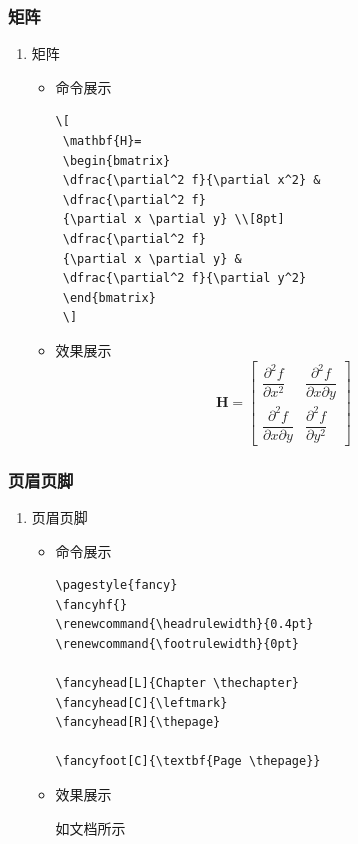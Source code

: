 \documentclass[UTF8]{ctexart}
\begin{document}
\subsubsection{矩阵}
\begin{enumerate}
  \item 矩阵
   \begin{itemize}
      \item 命令展示
\begin{lstlisting}
\[
 \mathbf{H}=
 \begin{bmatrix}
 \dfrac{\partial^2 f}{\partial x^2} &
 \dfrac{\partial^2 f}
 {\partial x \partial y} \\[8pt]
 \dfrac{\partial^2 f}
 {\partial x \partial y} &
 \dfrac{\partial^2 f}{\partial y^2}
 \end{bmatrix}
 \]
\end{lstlisting}
\item 效果展示
\[
 \mathbf{H}=
 \begin{bmatrix}
 \dfrac{\partial^2 f}{\partial x^2} &
 \dfrac{\partial^2 f}
 {\partial x \partial y} \\[8pt]
 \dfrac{\partial^2 f}
 {\partial x \partial y} &
 \dfrac{\partial^2 f}{\partial y^2}
 \end{bmatrix}
 \]
\end{itemize}
\end{enumerate}
\subsubsection{页眉页脚}
\begin{enumerate}
  \item 页眉页脚
   \begin{itemize}
      \item 命令展示
\begin{lstlisting}
\pagestyle{fancy}
\fancyhf{}
\renewcommand{\headrulewidth}{0.4pt}
\renewcommand{\footrulewidth}{0pt} 

\fancyhead[L]{Chapter \thechapter}
\fancyhead[C]{\leftmark}
\fancyhead[R]{\thepage} 

\fancyfoot[C]{\textbf{Page \thepage}}

\end{lstlisting}
\item 效果展示
\pagestyle{fancy}
\fancyhf{} %
\renewcommand{\headrulewidth}{0.4pt} %
\renewcommand{\footrulewidth}{0pt} %

\fancyhead[C]{\leftmark} %
\fancyhead[R]{\thepage} %

如文档所示
\end{itemize}
\end{enumerate}
\end{document}
